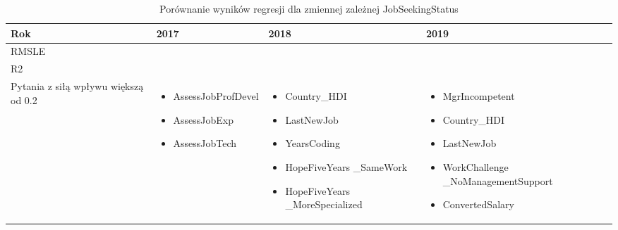 \noindent\begin{minipage}{\textwidth}
             \begin{table}[H]
                 \raggedright\caption{Porównanie wyników regresji dla zmiennej zależnej JobSeekingStatus\label{tabela:JobSeekingStatusRegression}}
                 \begin{center}
                     \begin{tabular}{|P{.1\textwidth}|P{.26\textwidth}|P{.26\textwidth}|P{.26\textwidth}|}

                         \hline
                         Rok   & 2017             & 2018             & 2019             \\
                         \hline
                         RMSLE &  &  &  \\
                         \hline
                         R2    &  &    &    \\
                         \hline
                         Pytania z siłą wpływu większą od 0.2 &
                         \begin{itemize}
                             \item AssessJobProfDevel
                             \item AssessJobExp
                             \item AssessJobTech
                         \end{itemize} &
                         \begin{itemize}
                             \item Country\_HDI
                             \item LastNewJob
                             \item YearsCoding
                             \item HopeFiveYears \_SameWork
                             \item HopeFiveYears \_MoreSpecialized
                         \end{itemize} &
                         \begin{itemize}
                             \item MgrIncompetent
                             \item Country\_HDI
                             \item LastNewJob
                             \item WorkChallenge \_NoManagementSupport
                             \item ConvertedSalary
                         \end{itemize} \\
                         \hline
                     \end{tabular}
                 \end{center}
                 \raggedright\source{\ownwork}
                 \vspace{0.75cm}
             \end{table}
\end{minipage}

